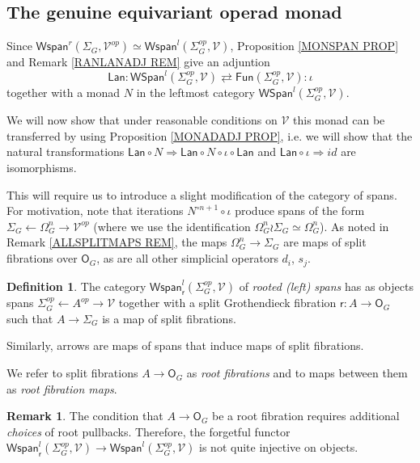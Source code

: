 \documentclass[a4paper,10pt
,draft
]{article}%
\numberwithin{equation}{section}
\numberwithin{figure}{section}
\theoremstyle{definition} %
\newtheorem{definition}[equation]{Definition}%
\newtheorem{remark}[equation]{Remark}%
\newcommand{\F}{\ensuremath{\mathcal F}}
\newcommand{\1}{\ensuremath{\mathbbm 1}}%
\begin{document}
\renewcommand{\F}{\mathbb{F}}

\subsection{The genuine equivariant operad monad} \label{FGMON SEC}


Since 
$\mathsf{Wspan}^r(\Sigma_G,\mathcal{V}^{op}) \simeq 
\mathsf{Wspan}^l(\Sigma_G^{op},\mathcal{V})$,
Proposition \ref{MONSPAN PROP} and Remark \ref{RANLANADJ REM} give an adjuntion
\[
	\mathsf{Lan} \colon
	\mathsf{WSpan}^l(\Sigma^{op}_G, \mathcal{V})
		\rightleftarrows
	\mathsf{Fun}(\Sigma^{op}_G, \mathcal{V})
	\colon \iota
\]
together with a monad $N$ in the leftmost category $\mathsf{WSpan}^l(\Sigma^{op}_G, \mathcal{V})$.


We will now show that under reasonable conditions on 
$\mathcal{V}$ this monad can be transferred by using 
Proposition \ref{MONADADJ PROP},
i.e. we will show that the natural transformations 
$
\mathsf{Lan} \circ N \Rightarrow \mathsf{Lan} \circ N \circ \iota \circ \mathsf{Lan}
$
and
$\mathsf{Lan} \circ \iota \Rightarrow id$
are isomorphisms.

This will require us to introduce a slight modification of the category of spans.
For motivation, note that iterations
$N^{\circ n+1} \circ \iota$ produce spans of the form
$\Sigma_G \leftarrow \Omega_G^{n} \to \mathcal{V}^{op}$
(where we use the identification $\Omega_G^{n} \wr \Sigma_G \simeq \Omega_G^{n}$). 
As noted in Remark \ref{ALLSPLITMAPS REM}, the maps 
$\Omega_G^{n} \to \Sigma_G$ are maps of split fibrations over $\mathsf{O}_G$, as are all other simplicial operators $d_i$, $s_j$.

\begin{definition}
The category $\mathsf{Wspan}^l_{\mathsf{r}}(\Sigma_G^{op},\mathcal{V})$ of \textit{rooted (left) spans}
has as objects spans
$\Sigma_G^{op} \leftarrow A^{op} \to \mathcal{V}$
together with a split Grothendieck fibration 
$\mathsf{r} \colon A \to \mathsf{O}_G$
such that $A \to \Sigma_G$ is a map of split fibrations.

Similarly, arrows are maps of spans that induce maps of split fibrations.
\end{definition}

We refer to split fibrations $A \to \mathsf{O}_G$
as \textit{root fibrations}
and to maps between them as \textit{root fibration maps}.

\begin{remark}
The condition that $A \to \mathsf{O}_G$
be a root fibration requires additional \textit{choices} of root pullbacks. Therefore, the forgetful functor 
$\mathsf{Wspan}^l_{\mathsf{r}}(\Sigma_G^{op},\mathcal{V})
\to
\mathsf{Wspan}^l(\Sigma_G^{op},\mathcal{V})$
is not quite injective on objects.
\end{remark}
\end{document}
